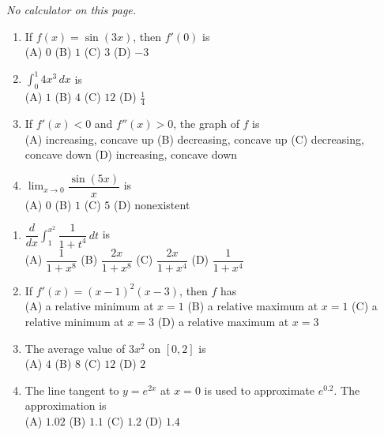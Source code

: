 \documentclass[11pt]{article}
\begin{document}
\newpage
{}
\emph{No calculator on this page.}
\begin{enumerate}[leftmargin=*,itemsep=2pt]
  \item If $f(x)=\sin(3x)$, then $f'(0)$ is \\[2pt] (A) $0$ \qquad (B) $1$ \qquad (C) $3$ \qquad (D) $-3$\work{2.3cm}
  \item $\displaystyle\int_{0}^{1}4x^3\,dx$ is \\[2pt] (A) $1$ \qquad (B) $4$ \qquad (C) $12$ \qquad (D) $\tfrac14$\work{2.3cm}
  \item If $f'(x)<0$ and $f''(x)>0$, the graph of $f$ is \\[2pt] (A) increasing, concave up \qquad (B) decreasing, concave up \qquad (C) decreasing, concave down \qquad (D) increasing, concave down\work{2.3cm}
  \item $\displaystyle\lim_{x\to0}\dfrac{\sin(5x)}{x}$ is \\[2pt] (A) $0$ \qquad (B) $1$ \qquad (C) $5$ \qquad (D) nonexistent\work{2.3cm}
\end{enumerate}

\begin{enumerate}[leftmargin=*,itemsep=2pt,start=5]
  \item $\dfrac{d}{dx}\displaystyle\int_{1}^{x^2}\dfrac{1}{1+t^4}\,dt$ is \\[2pt] (A) $\dfrac{1}{1+x^8}$ \qquad (B) $\dfrac{2x}{1+x^8}$ \qquad (C) $\dfrac{2x}{1+x^4}$ \qquad (D) $\dfrac{1}{1+x^4}$\work{2.8cm}
  \item If $f'(x)=(x-1)^2(x-3)$, then $f$ has \\[2pt] (A) a relative minimum at $x=1$ \qquad (B) a relative maximum at $x=1$ \qquad (C) a relative minimum at $x=3$ \qquad (D) a relative maximum at $x=3$\work{2.8cm}
  \item The average value of $3x^2$ on $[0,2]$ is \\[2pt] (A) $4$ \qquad (B) $8$ \qquad (C) $12$ \qquad (D) $2$\work{2.8cm}
  \item The line tangent to $y=e^{2x}$ at $x=0$ is used to approximate $e^{0.2}$. The approximation is \\[2pt] (A) $1.02$ \qquad (B) $1.1$ \qquad (C) $1.2$ \qquad (D) $1.4$\work{2.8cm}
\end{enumerate}
\end{document}
